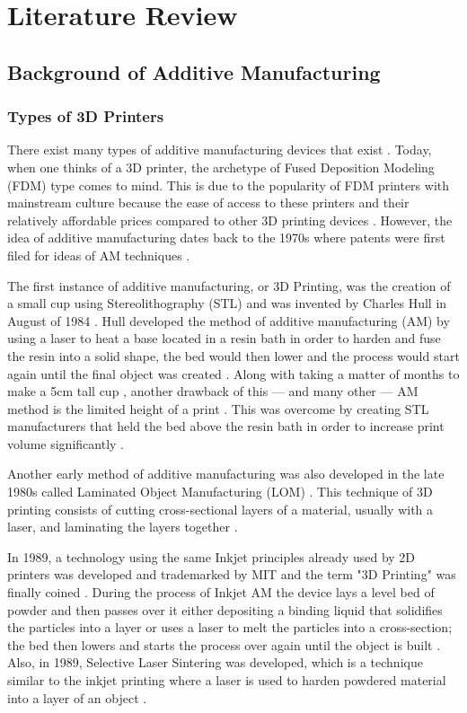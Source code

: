 \chapter{Literature Review}
\section{Background of Additive Manufacturing}
\subsection{Types of 3D Printers}
	There exist many types of additive manufacturing devices that exist \citep{Gross2014, Savini2015}. Today, when one thinks of a 3D printer, the archetype of Fused Deposition Modeling (FDM) type comes to mind. This is due to the popularity of FDM printers with mainstream culture because the ease of access to these printers and their relatively affordable prices compared to other 3D printing devices \citep{Gross2014, Savini2015}. However, the idea of additive manufacturing dates back to the 1970s where patents were first filed for ideas of AM techniques \citep{Savini2015}.\par
		The first instance of additive manufacturing, or 3D Printing, was the creation of a small cup using Stereolithography (STL) and was invented by Charles Hull in August of 1984 \citep{Savini2015}. Hull developed the method of additive manufacturing (AM) by using a laser to heat a base located in a resin bath in order to harden and fuse the resin into a solid shape, the bed would then lower and the process would start again until the final object was created \citep{Gross2014}. Along with taking a matter of months to make a 5cm tall cup \citep{Savini2015}, another drawback of this --- and many other --- AM method is the limited height of a print \citep{Gross2014}. This was overcome by creating STL manufacturers that held the bed above the resin bath in order to increase print volume significantly \citep{Gross2014}.\par
		Another early method of additive manufacturing was also developed in the late 1980s called Laminated Object Manufacturing (LOM) \citep{Savini2015}. This technique of 3D printing consists of cutting cross-sectional layers of a material, usually with a laser, and laminating the layers together \citep{Savini2015}.\par
		In 1989, a technology using the same Inkjet principles already used by 2D printers was developed and trademarked by MIT and the term "3D Printing" was finally coined \citep{Savini2015}. During the process of Inkjet AM the device lays a level bed of powder and then passes over it either depositing a binding liquid that solidifies the particles into a layer or uses a laser to melt the particles into a cross-section; the bed then lowers and starts the process over again until the object is built \citep{Gross2014}. Also, in 1989, Selective Laser Sintering was developed, which is a technique similar to the inkjet printing where a laser is used to harden powdered material into a layer of an object \citep{Savini2015}.\par
